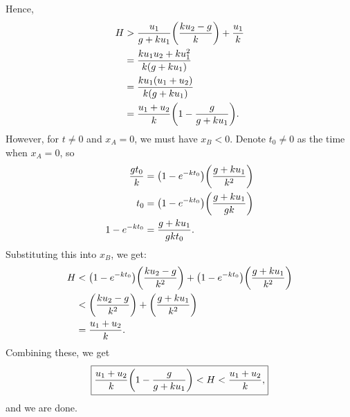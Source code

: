 \documentclass[12pt]{article}
\begin{document}
Hence,
\begin{align*}
	H & > \dfrac{u_1}{g+ku_1}\qty(\dfrac{ku_2-g}{k}) + \dfrac{u_1}{k} \\
	  & = \dfrac{ku_1u_2 +ku_1^2}{k(g+ku_1)}                          \\
	  & = \dfrac{ku_1(u_1+u_2)}{k(g+ku_1)}                            \\
	  & = \dfrac{u_1+u_2}{k}\qty(1 - \dfrac{g}{g+ku_1}).
\end{align*}
However, for $t \neq 0$ and $x_A = 0$, we must have $x_B < 0$.
Denote $t_0 \neq 0$ as the time when $x_A = 0$, so
\begin{align*}
	\dfrac{gt_0}{k} & = \qty(1-e^{-kt_0})\qty(\dfrac{g+ku_1}{k^2}) \\
	t_0             & = \qty(1-e^{-kt_0})\qty(\dfrac{g+ku_1}{gk})  \\
	1 - e^{-kt_0}   & = \dfrac{g+ku_1}{gkt_0}.
\end{align*}
Substituting this into $x_B$, we get:
\begin{align*}
	H & < \qty(1-e^{-kt_0})\qty(\dfrac{ku_2-g}{k^2}) + \qty(1-e^{-kt_0})\qty(\dfrac{g+ku_1}{k^2}) \\
	  & < \qty(\dfrac{ku_2-g}{k^2}) + \qty(\dfrac{g+ku_1}{k^2})                                   \\
	  & = \dfrac{u_1 +u_2}{k}.
\end{align*}
Combining these, we get
\[\boxed{
	  \dfrac{u_1+u_2}{k}\qty(1 - \dfrac{g}{g+ku_1}) < H < \dfrac{u_1+u_2}{k},
}\]
and we are done.
\end{document}
